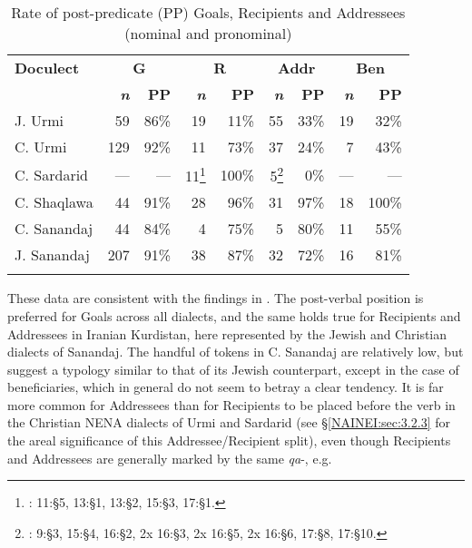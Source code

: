 \documentclass[output=paper,colorlinks,citecolor=brown,draftmode]{langscibook}
\begin{document}
\begin{table}[t]
        \begin{tabular}{lrrrrrrrr}
\lsptoprule
\textbf{Doculect} & \multicolumn{2}{c}{\textbf{G}} & \multicolumn{2}{c}{\textbf{R}} & \multicolumn{2}{c}{\textbf{Addr}} & \multicolumn{2}{c}{\textbf{Ben}}  \\
  \cmidrule(lr){2-3}\cmidrule(lr){4-5}\cmidrule(lr){6-7}
& \textbf{\textit{n}} & \textbf{PP} & \textbf{\textit{n}} & \textbf{PP} & \textbf{\textit{n}} & \textbf{PP} & \textit{\textbf{n}} & \textbf{PP} \\
\midrule
J. Urmi & 59 & 86\% & 19 & 11\% & 55 & 33\% & 19 & 32\% \\
C. Urmi & 129 & 92\% & 11 & 73\% & 37 & 24\% & 7 & 43\% \\
C. Sardarid & --- & --- & 11\parbox{0mm}{\footnote{\citealt{Younansardaroud2001Sardarid}: 11:§5, 13:§1, 13:§2, 15:§3, 17:§1.}} & 100\% & 5\parbox{0mm}{\footnote{\citealt{Younansardaroud2001Sardarid}: 9:§3, 15:§4, 16:§2, 2x 16:§3, 2x 16:§5, 2x 16:§6, 17:§8, 17:§10.}} & 0\% & --- & --- \\
C. Shaqlawa & 44 & 91\% & 28 & 96\% & 31 & 97\% & 18 & 100\% \\
C. Sanandaj & 44 & 84\% & 4 & 75\% & 5 & 80\% & 11 & 55\% \\
J. Sanandaj & 207 & 91\% & 38 & 87\% & 32 & 72\% & 16 & 81\% \\
\lspbottomrule
    \end{tabular}
    \caption{Rate of post-predicate (PP) Goals, Recipients and Addressees (nominal and pronominal)}
    \label{NAINEI:tab:5}
\end{table}
These data are consistent with the findings in \citet{NoorlanderMolin2022WordOrder}. The post-verbal position is preferred for Goals across all dialects, and the same holds true for Recipients and Addressees in Iranian Kurdistan, here represented by the Jewish and Christian dialects of Sanandaj. The handful of tokens in C. Sanandaj are relatively low, but suggest a typology similar to that of its Jewish counterpart, except in the case of beneficiaries, which in general do not seem to betray a clear tendency. It is far more common for Addressees than for Recipients to be placed before the verb in the Christian NENA dialects of Urmi and Sardarid (see §\ref{NAINEI:sec:3.2.3} for the areal significance of this Addressee/Recipient split), even though Recipients and Addressees are   generally marked by the same  \textit{qa}-, e.g. 
\end{document}
